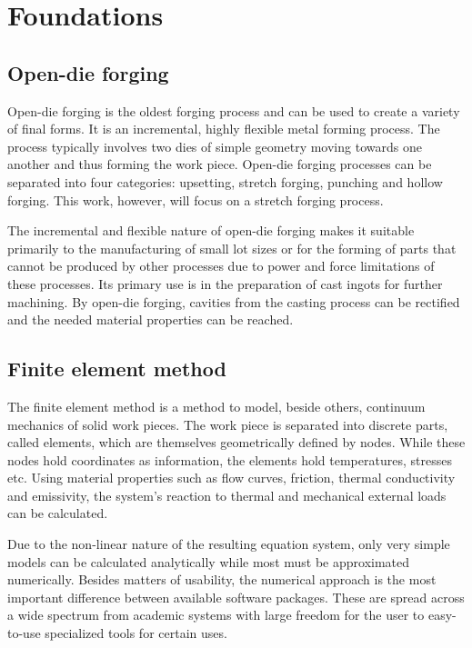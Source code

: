\section{Foundations}

\subsection{Open-die forging}
Open-die forging is the oldest forging process and can be used to create a variety of final forms. It is an incremental, highly flexible metal forming process. The process typically involves two dies of simple geometry moving towards one another and thus forming the work piece. Open-die forging processes can be separated into four categories: upsetting, stretch forging, punching and hollow forging. This work, however, will focus on a stretch forging process.\cite{hbut}

The incremental and flexible nature of open-die forging makes it suitable primarily to the manufacturing of small lot sizes or for the forming of parts that cannot be produced by other processes due to power and force limitations of these processes. Its primary use is in the preparation of cast ingots for further machining. By open-die forging, cavities from the casting process can be rectified and the needed material properties can be reached.\cite{forgcomp}

\subsection{Finite element method}
The finite element method is a method to model, beside others, continuum mechanics of solid work pieces. The work piece is separated into discrete parts, called elements, which are themselves geometrically defined by nodes. While these nodes hold coordinates as information, the elements hold temperatures, stresses etc. Using material properties such as flow curves, friction, thermal conductivity and emissivity, the system's reaction to thermal and mechanical external loads can be calculated.

Due to the non-linear nature of the resulting equation system, only very simple models can be calculated analytically while most must be approximated numerically. Besides matters of usability, the numerical approach is the most important difference between available software packages. These are spread across a wide spectrum from academic systems with large freedom for the user to easy-to-use specialized tools for certain uses.
